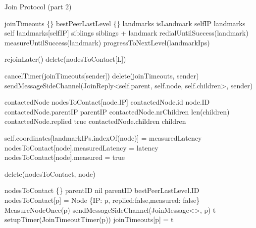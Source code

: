 \begin{algorithm}
\begin{algorithmic}[1]

\caption{Join Protocol (part 2)}
        \State joinTimeouts \asdassign \{\}
        \State bestPeerLastLevel \asdassign \{\}
        \State landmarks \asdassign []
        \State isLandmark \asdassign selfIP \asdin landmarks
            \State self \asdassign landmarks[selfIP]
                \State siblings \asdassign siblings + landmark
                \State redialUntilSuccess(landmark)
                \State measureUntilSuccess(landmark)
            \EndFor
        \Else 
            \State progressToNextLevel(landmarkIps)
        \EndIf
    \asdend
    
\asdupon[JoinTimeoutTimer(L)]
            \State rejoinLater()
        \Else
            \State delete(nodesToContact[L])
        \EndIf
    \asdend
    
        \State cancelTimer(joinTimeouts[sender])
        \State delete(joinTimeouts, sender)
        \State sendMessageSideChannel(JoinReply<self.parent, self.node, self.children>, sender)
    \asdend
    
        \State contactedNode \asdassign nodesToContact[node.IP]
        \State contactedNode.id \asdassign node.ID
        \State contactedNode.parentIP \asdassign parentIP
        \State contactedNode.nrChildren \asdassign len(children)
        \State contactedNode.replied \asdassign true
        \State contactedNode.children \asdassign children
    \asdend
   
            \State self.coordinates[landmarkIPs.indexOf(node)] = measuredLatency
        \EndIf
        \State nodesToContact[node].measuredLatency = latency
        \State nodesToContact[node].measured = true
    \asdend
        
    \State delete(nodesToContact, node)
\asdend

    \State nodesToContact \asdassign \{\}
    \State parentID \asdassign  nil
        \State parentID \asdassign  bestPeerLastLevel.ID
    \EndIf
        \State nodesToContact[p] = Node \{IP: p, replied:false,measured: false\}
        \State MeasureNodeOnce(p) 
        \State sendMessageSideChannel(JoinMessage<>, p)
        \State t \asdassign setupTimer(JoinTimeoutTimer(p))
        \State joinTimeouts[p] = t
    \EndFor
\asdend

\end{algorithmic}
\end{algorithm}

